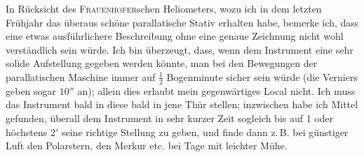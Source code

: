 \par\indent In Rücksicht des \textsc{Frauenhofer}schen Heliometers, wozu ich in dem letzten Frühjahr das überaus
schöne parallatische Stativ erhalten habe, bemerke ich, dass eine etwas ausführlichere Beschreibung
ohne eine genaue Zeichnung nicht wohl verständlich sein würde. Ich bin überzeugt, dass, wenn dem
Instrument eine sehr solide Aufstellung gegeben werden könnte, man bei den Bewegungen der parallatischen Maschine immer auf $\tfrac12$ Bogenminute sicher sein würde (die Verniers geben sogar $10''$ an); allein
dies erlaubt mein gegenwärtiges Local nicht. Ich muss das Instrument bald in diese bald in jene Thür
stellen; inzwischen habe ich Mittel gefunden, überall dem Instrument in sehr kurzer Zeit sogleich bis
auf 1 oder höchstens $2'$ seine richtige Stellung zu geben, und finde dann z.\,B. bei günstiger Luft den
Polarstern, den Merkur etc. bei Tage mit leichter Mühe.
